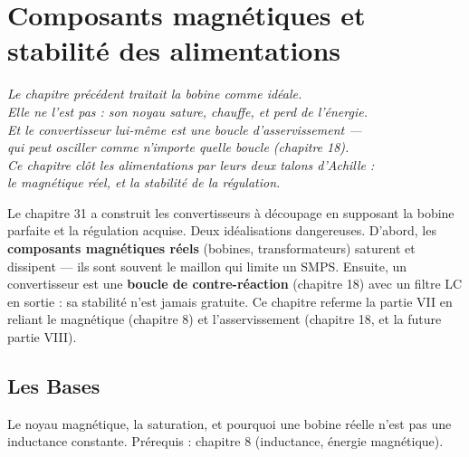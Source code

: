 \documentclass[12pt,a4paper,twoside]{book}
\begin{document}

\chapter{Composants magnétiques et stabilité des alimentations}

\begin{center}
\textit{Le chapitre précédent traitait la bobine comme idéale.\\
Elle ne l'est pas : son noyau sature, chauffe, et perd de l'énergie.\\
Et le convertisseur lui-même est une boucle d'asservissement ---\\
qui peut osciller comme n'importe quelle boucle (chapitre 18).\\
Ce chapitre clôt les alimentations par leurs deux talons d'Achille :\\
le magnétique réel, et la stabilité de la régulation.}
\end{center}

\vspace{0.5cm}

Le chapitre 31 a construit les convertisseurs à découpage en supposant la bobine parfaite et la régulation acquise. Deux idéalisations dangereuses. D'abord, les \textbf{composants magnétiques réels} (bobines, transformateurs) saturent et dissipent --- ils sont souvent le maillon qui limite un SMPS. Ensuite, un convertisseur est une \textbf{boucle de contre-réaction} (chapitre 18) avec un filtre LC en sortie : sa stabilité n'est jamais gratuite. Ce chapitre referme la partie VII en reliant le magnétique (chapitre 8) et l'asservissement (chapitre 18, et la future partie VIII).

\section{Les Bases}

\begin{bases}
Le noyau magnétique, la saturation, et pourquoi une bobine réelle n'est pas une inductance constante. Prérequis : chapitre 8 (inductance, énergie magnétique).
\end{bases}
\end{document}
